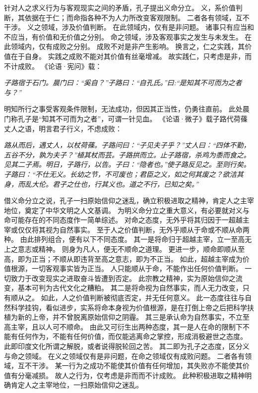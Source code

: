 \documentclass[11pt]{article}
\begin{document}
\newline

针对人之求义行为与客观现实之间的矛盾，孔子提出义命分立。
义，系价值判断，其依据在于仁；而命指各种不为人力所改变客观限制。
二者各有领域，互不干涉。
义之领域，涉及价值判断。
在此领域内，仅有是非问题。
诸事只有应当和不应当，有价值和无价值之分别。
命之领域，涉及客观事实之发生与未发生。
在此领域内，仅有成败之分别。
成败不对是非产生影响。
换言之，仁之实践，其价值在于自身。
实践之成败不能对其价值有丝毫增减。
故实践仁，只考虑是非，而不计成败。
《论语·宪问》载：

\textit{子路宿于石门。晨门曰：“奚自？”子路曰：“自孔氏。”曰:“是知其不可而为之者与？”}

明知所行之事受客观条件限制，无法成功，但因其正当性，仍勇往直前。
此处晨门称孔子是“知其不可而为之者”，可谓一针见血。
《论语·微子》载子路代荷蓧丈人之语，明言君子行义，不虑成败：

\textit{路从而后，遇丈人，以杖荷蓧。子路问曰：“子见夫子乎？”丈人曰：“四体不勤，五谷不分，孰为夫子？”植其杖而芸。子路拱而立。止子路宿，杀鸡为黍而食之。见其二子焉。明日，子路行，以告。子曰：“隐者也。”使子路反见之。至则行矣。子路曰：“不仕无义。长幼之节，不可废也；君臣之义，如之何其废之？欲洁其身，而乱大伦。君子之仕也，行其义也。道之不行，已知之矣。”}

\newline

借义命分立之说，孔子一扫原始信仰之迷乱，确立积极进取之精神，肯定人之主宰地位，奠定了中华文明之人文基调。
为明义命分立之重大意义，有必要就对义与命可能存在的不同态度作一简单综述。
对命之态度，无外乎将其归因于一超越主宰或仅仅将其视为自然事实。
至于人之价值判断，无外乎顺从于命或不顺从命两种。
由此排列组合，便有以下不同态度。
其一是将命归于超越主宰，立一至高无上之意志或精神。
则身为凡人，便无不顺命之道理。
更进一步，顺命即顺从至高，即为正当；不顺从即违背至高之意志，即为不正当。
如此，超越主宰成为价值根源，一切客观事实皆为正当。
人只能顺从于命，不能作出任何价值判断。
一切致力于改变现实之进取奋斗皆遭到否定。
此宗教之精神，实为原始信仰之流变，基本可判为古代文化之糟粕。
其二是将命视为自然事实，而人无力改变，只有顺从之。
如此，人之价值判断被彻底否定，并无任何意义。
此一态度往往与自然科学挂钩，看似进步，实系将命本身视为价值根源，是在打倒上帝之后把科学扶植为新的上帝，并不曾脱离原始信仰之阴霾。
其三是承认命为自然事实，不立至高主宰，且以人可不顺命。
由此又可衍生出两种态度，其一是人在命的限制下不能有任何作为，不能有任何价值，而仅能逃离命之掌控，形成消极避世之态度。
此即印度文化所谓之解脱，或者说得脱轮回之苦。
其二即为孔子之态度，区分义与命之领域。
在义之领域仅有是非问题，在命之领域仅有成败问题。
二者各有领域，互不干涉。
某一行为之成功不能使其价值有任何增加，其失败亦不能使其价值有分毫减损。
故人之行为，仅考虑是非而而不计成败。
此种积极进取之精神明确肯定人之主宰地位，一扫原始信仰之迷乱。
\end{document}
